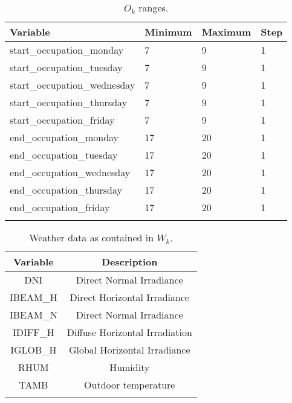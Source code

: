 \begin{table}
	\centering
	\begin{tabular}{@{}llll@{}}
		Variable                     & Minimum & Maximum & Step \\ \midrule
		start\_occupation\_monday    & 7       & 9       & 1    \\
		start\_occupation\_tuesday   & 7       & 9       & 1    \\
		start\_occupation\_wednesday & 7       & 9       & 1    \\
		start\_occupation\_thursday  & 7       & 9       & 1    \\
		start\_occupation\_friday    & 7       & 9       & 1    \\
		end\_occupation\_monday      & 17      & 20      & 1    \\
		end\_occupation\_tuesday     & 17      & 20      & 1    \\
		end\_occupation\_wednesday   & 17      & 20      & 1    \\
		end\_occupation\_thursday    & 17      & 20      & 1    \\
		end\_occupation\_friday      & 17      & 20      & 1    \\
		\bottomrule                                             \\
	\end{tabular}
	\caption{$O_k$ ranges.}
	\label{tab:Ok}
\end{table}

\begin{table}
	\centering
	\begin{tabular}{*2c}
		Variable & Description                    \\ \midrule
		DNI      & Direct Normal Irradiance       \\
		IBEAM\_H & Direct Horizontal Irradiance   \\
		IBEAM\_N & Direct Normal Irradiance       \\
		IDIFF\_H & Diffuse Horizontal Irradiation \\
		IGLOB\_H & Global Horizontal Irradiance   \\
		RHUM     & Humidity                       \\
		TAMB     & Outdoor temperature            \\
		\bottomrule                               \\
	\end{tabular}
	\caption{Weather data as contained in $W_k$.}
	\label{tab:Wk}
\end{table}